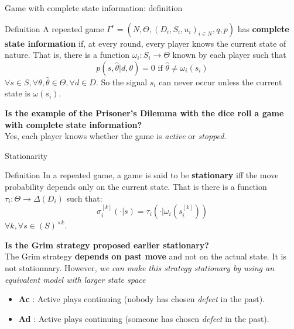 \begin{frame}{Game with complete state information: definition}
    \begin{block}{Definition}
        A repeated game $\Gamma^r = (N,\Theta, (D_i,S_i,u_i)_{i\in N},q,p)$ has
        \textbf{complete state information} if, at every round, every player knows
        the current state of nature. That is, there is a function
        $\omega_i:S_i \rightarrow \Theta$ known by each player such that
        \begin{equation*}
            p(s,\hat{\theta} | d,\theta) = 0 \text{ if } \hat{\theta} \neq \omega_i(s_i)
        \end{equation*}
        $\forall s \in S, \forall \theta, \hat{\theta} \in \Theta, \forall d \in D$.
        So the signal $s_i$ can never occur unless the current state is $\omega(s_i)$.
    \end{block}

    \pause
    \textbf{{\color{green}Is the example of the Prisoner's Dilemma with the dice roll a game
    with complete state information?}} \\
    \pause
    Yes, each player knows whether the game is \textit{active} or \textit{stopped}.
\end{frame}

\begin{frame}{Stationarity}
    \begin{block}{Definition}
        In a repeated game, a game is said to be \textbf{stationary} iff the move probability
        depends only on the current state. That is there is a function $\tau_i : \Theta
        \rightarrow \Delta(D_i)$ such that:
        \begin{equation*}
	        \sigma_i^{[k]}(\cdot | s) = \tau_i(\cdot | \omega_i(s_i^{[k]}))
        \end{equation*}
        $\forall k, \forall s \in (S)^{\times k}$.
    \end{block}

    \pause
    \textbf{{\color{green}Is the Grim strategy proposed earlier stationary?}} \\
    \pause
    The Grim strategy \textbf{depends on past move} and not on the actual state. It
    is not stationnary.
    \pause
    However, \textit{we can make this strategy stationary by using an equivalent model with larger
    state space}
    \begin{itemize}
        \item \textbf{Ac} : Active plays continuing (nobody has chosen \textit{defect} in the past).
        \item \textbf{Ad} : Active plays continuing (someone has chosen \textit{defect} in the past).
    \end{itemize}
\end{frame}

